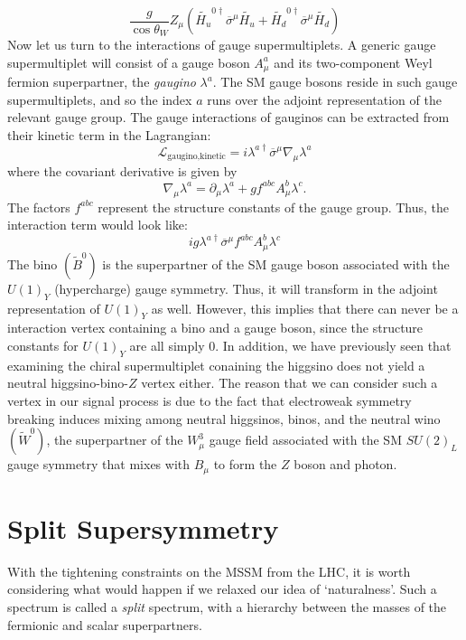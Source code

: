 \[\frac{g}{\cos\theta_W}Z_\mu\left(\widetilde{H_u}^{0\dagger}\overline{\sigma}^\mu \widetilde{H_u}+
\widetilde{H_d}^{0\dagger}\overline{\sigma}^\mu \widetilde{H_d}\right)\]
Now let us turn to the interactions of gauge supermultiplets. A generic gauge supermultiplet will consist of a gauge boson $A_\mu^a$ and its two-component Weyl fermion superpartner, the \emph{gaugino} $\lambda^a$. The SM gauge bosons reside in such gauge supermultiplets, and so the index $a$ runs over the adjoint representation of the relevant gauge group. The gauge interactions of gauginos can be extracted from their kinetic term in the Lagrangian:
\[\mathcal{L}_{\text{gaugino,kinetic}} = i\lambda^{a\dagger}\overline{\sigma}^\mu\nabla_\mu\lambda^a\]
where the covariant derivative is given by
\[\nabla_\mu\lambda^a = \partial_\mu\lambda^a + gf^{abc}A_\mu^b\lambda^c.\]
The factors $f^{abc}$ represent the structure constants of the gauge group. Thus, the interaction term would look like:
\[ig\lambda^{a\dagger}\overline{\sigma}^\mu f^{abc}A_\mu^b\lambda^c\]
The bino $(\widetilde{B}^0)$ is the superpartner of the SM gauge boson associated with the $U(1)_Y$ (hypercharge) gauge symmetry. Thus, it will transform in the adjoint representation of $U(1)_Y$ as well. However, this implies that there can never be a interaction vertex containing a bino and a gauge boson, since the structure constants for $U(1)_Y$ are all simply 0. In addition, we have previously seen that examining the chiral supermultiplet conaining the higgsino does not yield a neutral higgsino-bino-$Z$ vertex either. The reason that we can consider such a vertex in our signal process is due to the fact that electroweak symmetry breaking induces mixing among neutral higgsinos, binos, and the neutral wino $(\widetilde{W}^0)$, the superpartner of the $W_\mu^3$ gauge field associated with the SM $SU(2)_L$ gauge symmetry that mixes with $B_\mu$ to form the $Z$ boson and photon.

\section{Split Supersymmetry}
With the tightening constraints on the MSSM from the LHC, it is worth considering what would happen if we relaxed our idea of `naturalness'. Such a spectrum is called a \emph{split} spectrum, with a hierarchy between the masses of the fermionic and scalar superpartners.
